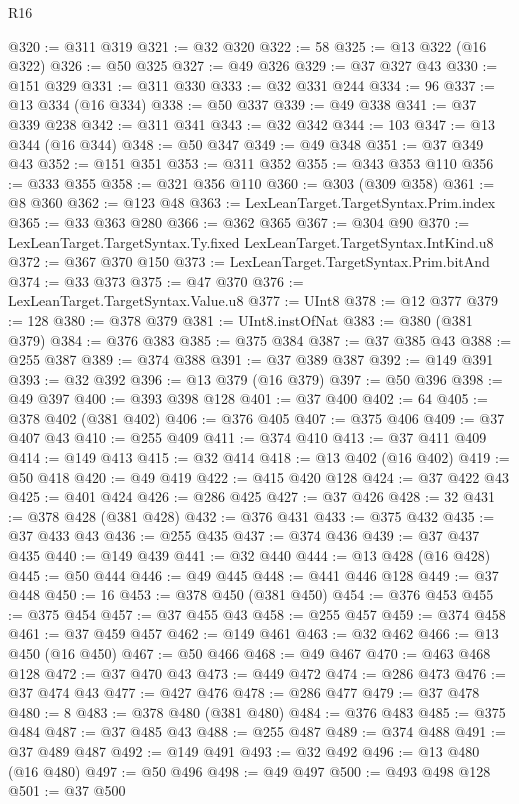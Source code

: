 \begin{lexlean}{R16}
\begin{coremodule}
{{{{{{{{{{{{{{{{{@320 := @311 @319
@321 := @32 @320
@322 := 58
@325 := @13 @322 (@16 @322)
@326 := @50 @325
@327 := @49 @326
@329 := @37 @327 @43
@330 := @151 @329
@331 := @311 @330
@333 := @32 @331 @244
@334 := 96
@337 := @13 @334 (@16 @334)
@338 := @50 @337
@339 := @49 @338
@341 := @37 @339 @238
@342 := @311 @341
@343 := @32 @342
@344 := 103
@347 := @13 @344 (@16 @344)
@348 := @50 @347
@349 := @49 @348
@351 := @37 @349 @43
@352 := @151 @351
@353 := @311 @352
@355 := @343 @353 @110
@356 := @333 @355
@358 := @321 @356 @110
@360 := @303 (@309 @358)
@361 := @8 @360
@362 := @123 @48
@363 := LexLeanTarget.TargetSyntax.Prim.index
@365 := @33 @363 @280
@366 := @362 @365
@367 := @304 @90
@370 := LexLeanTarget.TargetSyntax.Ty.fixed LexLeanTarget.TargetSyntax.IntKind.u8
@372 := @367 @370 @150
@373 := LexLeanTarget.TargetSyntax.Prim.bitAnd
@374 := @33 @373
@375 := @47 @370
@376 := LexLeanTarget.TargetSyntax.Value.u8
@377 := UInt8
@378 := @12 @377
@379 := 128
@380 := @378 @379
@381 := UInt8.instOfNat
@383 := @380 (@381 @379)
@384 := @376 @383
@385 := @375 @384
@387 := @37 @385 @43
@388 := @255 @387
@389 := @374 @388
@391 := @37 @389 @387
@392 := @149 @391
@393 := @32 @392
@396 := @13 @379 (@16 @379)
@397 := @50 @396
@398 := @49 @397
@400 := @393 @398 @128
@401 := @37 @400
@402 := 64
@405 := @378 @402 (@381 @402)
@406 := @376 @405
@407 := @375 @406
@409 := @37 @407 @43
@410 := @255 @409
@411 := @374 @410
@413 := @37 @411 @409
@414 := @149 @413
@415 := @32 @414
@418 := @13 @402 (@16 @402)
@419 := @50 @418
@420 := @49 @419
@422 := @415 @420 @128
@424 := @37 @422 @43
@425 := @401 @424
@426 := @286 @425
@427 := @37 @426
@428 := 32
@431 := @378 @428 (@381 @428)
@432 := @376 @431
@433 := @375 @432
@435 := @37 @433 @43
@436 := @255 @435
@437 := @374 @436
@439 := @37 @437 @435
@440 := @149 @439
@441 := @32 @440
@444 := @13 @428 (@16 @428)
@445 := @50 @444
@446 := @49 @445
@448 := @441 @446 @128
@449 := @37 @448
@450 := 16
@453 := @378 @450 (@381 @450)
@454 := @376 @453
@455 := @375 @454
@457 := @37 @455 @43
@458 := @255 @457
@459 := @374 @458
@461 := @37 @459 @457
@462 := @149 @461
@463 := @32 @462
@466 := @13 @450 (@16 @450)
@467 := @50 @466
@468 := @49 @467
@470 := @463 @468 @128
@472 := @37 @470 @43
@473 := @449 @472
@474 := @286 @473
@476 := @37 @474 @43
@477 := @427 @476
@478 := @286 @477
@479 := @37 @478
@480 := 8
@483 := @378 @480 (@381 @480)
@484 := @376 @483
@485 := @375 @484
@487 := @37 @485 @43
@488 := @255 @487
@489 := @374 @488
@491 := @37 @489 @487
@492 := @149 @491
@493 := @32 @492
@496 := @13 @480 (@16 @480)
@497 := @50 @496
@498 := @49 @497
@500 := @493 @498 @128
@501 := @37 @500
}}}}}}}}}}}}}}}}}
\end{coremodule}
\end{lexlean}
